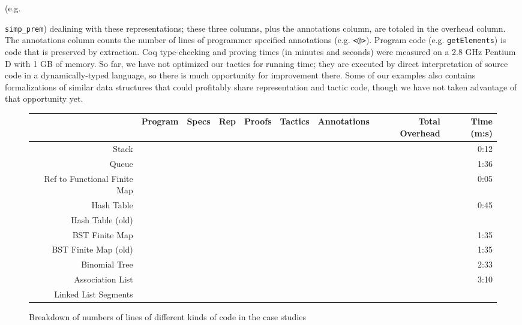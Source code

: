 \documentclass[preprint,nocopyrightspace]{sigplanconf}
\newcommand{\cd}[1]{\texttt{#1}}
\begin{document}
(e.g. {\cd{simp\_prem}) dealining with these representations; these
three columns, plus the annotations column, are totaled in the
overhead column.  The annotations column counts the number of lines of
programmer specified annotations (e.g. \cd{<@>}). Program code
(e.g. \cd{getElements}) is code that is preserved by extraction.  Coq
type-checking and proving times (in minutes and seconds) were measured
on a 2.8 GHz Pentium D with 1 GB of memory.  So far, we have not
optimized our tactics for running time; they are executed by direct
interpretation of source code in a dynamically-typed language, so
there is much opportunity for improvement there.  Some of our examples
also contains formalizations of similar data structures that could
profitably share representation and tactic code, though we have not
taken advantage of that opportunity yet.

\begin{figure*}
  \begin{center}
    \begin{tabular}{r | r | r | r | r | r | r | r | r}
                                             & Program & Specs & Rep & Proofs & Tactics &  Annotations    & Total Overhead & Time (m:s) \\ \hline
Stack                                        &         &       &     &        &         &                 &             & 0:12 \\
Queue                                        &         &       &     &        &         &                 &             & 1:36 \\
Ref to Functional Finite Map                 &         &       &     &        &         &                 &             & 0:05 \\
Hash Table                                   &         &       &     &        &         &                 &             & 0:45 \\
Hash Table (old)                             &         &       &     &        &         &                 &             &      \\
BST Finite Map                               &         &       &     &        &         &                 &             & 1:35 \\
BST Finite Map  (old)                        &         &       &     &        &         &                 &             & 1:35 \\
Binomial Tree                                &         &       &     &        &         &                 &             & 2:33 \\
Association List                             &         &       &     &        &         &                 &             & 3:10 \\
Linked List Segments                         &         &       &     &        &         &                 &             &      \\
    \end{tabular}
  \end{center}
\footnotesize
\normalsize
  \caption{\label{loc}Breakdown of numbers of lines of different kinds of code in the case studies}
\end{figure*}

}
\end{document}
